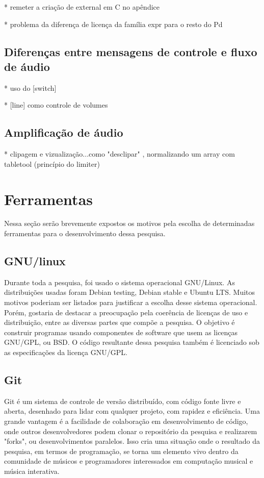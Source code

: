 \documentclass{ppgmus}
\begin{document}
* remeter a criação de external em C no apêndice

* problema da diferença de licença da família expr para o resto do Pd


\subsection{Diferenças entre mensagens de controle e fluxo de áudio}

* uso do [switch\texttildelow]

* [line\texttildelow] como controle de volumes


\subsection{Amplificação de áudio}

* clipagem e vizualização...como "desclipar" , normalizando um array com tabletool (princípio do limiter)

\section{Ferramentas}

Nessa seção serão brevemente expostos os motivos pela escolha de determinadas ferramentas para
o desenvolvimento dessa pesquisa.


\subsection{GNU/linux}

Durante toda a pesquisa, foi usado o sistema operacional GNU/Linux.
As distribuições usadas foram Debian testing, Debian stable e Ubuntu LTS.
Muitos motivos poderiam ser listados para justificar a escolha desse sistema
operacional. Porém, gostaria de destacar a preocupação pela coerência de licenças
de uso e distribuição, entre as diversas partes que compõe a pesquisa.
O objetivo é construir programas usando componentes de software que usem as licenças GNU/GPL, ou 
BSD. O código resultante dessa pesquisa também é licenciado sob as especificações
da licença GNU/GPL.



\subsection{Git}

Git é um sistema de controle de versão distribuído, com código fonte livre e aberta, desenhado para lidar com qualquer
projeto, com rapidez e eficiência.
Uma grande vantagem é a facilidade de colaboração em desenvolvimento de código, onde outros desenvolvedores
podem clonar o repositório da pesquisa e realizarem "forks", ou desenvolvimentos paralelos. Isso cria uma situação 
onde o resultado da pesquisa, em termos de programação, se torna um elemento vivo dentro da comunidade de músicos e 
programadores interessados em computação musical e música interativa.
\end{document}
